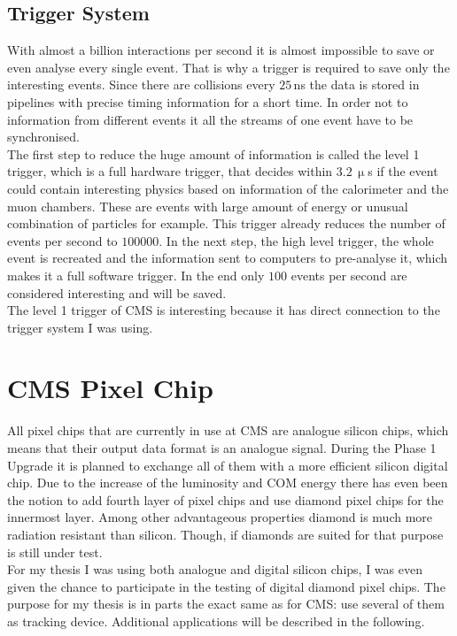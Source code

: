 \documentclass[british,11pt,a4paper]{memoir}
\begin{document}
\subsection{Trigger System}
With almost a billion interactions per second it is almost impossible to save or even analyse every single event. That is why a trigger is required to save only the interesting events. Since there are collisions every $25\,$ns the data is stored in pipelines with precise timing information for a short time. In order not to information from different events it all the streams of one event have to be synchronised. \\
The first step to reduce the huge amount of information is called the level 1 trigger, which is a full hardware trigger, that decides within $3.2\,\upmu$s if the event could contain interesting physics based on information of the calorimeter and the muon chambers. These are events with large amount of energy or unusual combination of particles for example. This trigger already reduces the number of events per second to $100000$. In the next step, the high level trigger, the whole event is recreated and the information sent to computers to pre-analyse it, which makes it a full software trigger. In the end only $100$ events per second are considered interesting and will be saved.\\ 
The level 1 trigger of \ac{CMS} is interesting because it has direct connection to the trigger system I was using. 
\section{CMS Pixel Chip}\label{s13}
All pixel chips that are currently in use at \ac{CMS} are analogue silicon chips, which means that their output data format is an analogue signal. During the Phase 1 Upgrade it is planned to exchange all of them with a more efficient silicon digital chip. Due to the increase of the luminosity and \ac{COM} energy there has even been the notion to add fourth layer of pixel chips and use diamond pixel chips for the innermost layer. Among other advantageous properties diamond is much more radiation resistant than silicon. Though, if diamonds are suited for that purpose is still under test.\\
For my thesis I was using both analogue and digital silicon chips, I was even given the chance to participate in the testing of digital diamond pixel chips. The purpose for my thesis is in parts the exact same as for \ac{CMS}: use several of them as tracking device. Additional applications will be described in the following.
\end{document}
